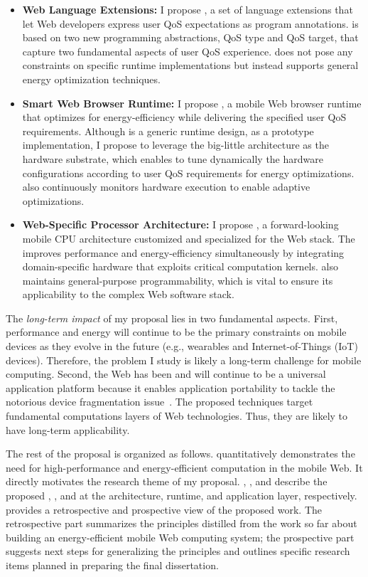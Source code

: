 \begin{itemize}
\item \textbf{Web Language Extensions:} I propose \greenweb, a set of language extensions that let Web developers express user QoS expectations as program annotations. \greenweb is based on two new programming abstractions, QoS type and QoS target, that capture two fundamental aspects of user QoS experience. \greenweb does not pose any constraints on specific runtime implementations but instead supports general energy optimization techniques.

\item \textbf{Smart Web Browser Runtime:} I propose \webrt, a  mobile Web browser runtime that optimizes for energy-efficiency while delivering the specified user QoS requirements. Although \webrt is a generic runtime design, as a prototype implementation, I propose to leverage the big-little architecture as the hardware substrate, which enables \webrt to tune dynamically the hardware configurations according to user QoS requirements for energy optimizations. \webrt also continuously monitors hardware execution to enable adaptive optimizations.

\item \textbf{Web-Specific Processor Architecture:} I propose \webcore, a forward-looking mobile CPU architecture customized and specialized for the Web stack. The \webcore improves performance and energy-efficiency simultaneously by integrating domain-specific hardware that exploits critical computation kernels. \webcore also maintains general-purpose programmability, which is vital to ensure its applicability to the complex Web software stack.
\end{itemize}

The \textit{long-term impact} of my proposal lies in two fundamental aspects.  First, performance and energy will continue to be the primary constraints on mobile devices as they evolve in the future (e.g., wearables and Internet-of-Things (IoT) devices). Therefore, the problem I study is likely a long-term challenge for mobile computing. Second, the Web has been and will continue to be a universal application platform because it enables application portability to tackle the notorious device fragmentation issue~\cite{fragmentation}. The proposed techniques target fundamental computations layers of Web technologies. Thus, they are likely to have long-term applicability.

The rest of the proposal is organized as follows.  quantitatively demonstrates the need for high-performance and energy-efficient computation in the mobile Web. It directly motivates the research theme of my proposal. , , and  describe the proposed \webcore, \webrt, and \greenweb at the architecture, runtime, and application layer, respectively.  provides a retrospective and prospective view of the proposed work. The retrospective part summarizes the principles distilled from the work so far about building an energy-efficient mobile Web computing system; the prospective part suggests next steps for generalizing the principles and outlines specific research items planned in preparing the final dissertation.
